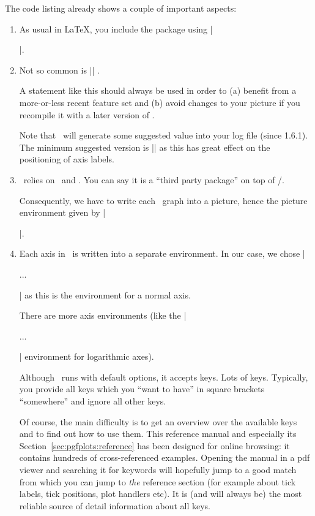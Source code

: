 The code listing already shows a couple of important aspects:
\begin{enumerate}
	\item As usual in \LaTeX, you include the package using |\usepackage{pgfplots}|.
	\item Not so common is |\pgfplotsset{compat=1.5}| .
	
	A statement like this should always be used in order to (a) benefit from a more-or-less recent feature set and (b) avoid changes to your picture if you recompile it with a later version of \PGFPlots.

	Note that \PGFPlots\ will generate some suggested value into your log file (since 1.6.1). The minimum suggested version is |\pgfplotsset{compat=1.3}| as this has great effect on the positioning of axis labels.
	
	\item \PGFPlots\ relies on \Tikz\ and \pgfname. You can say it is a ``third party package'' on top of \Tikz/\pgfname.
	
	Consequently, we have to write each \PGFPlots\ graph into a \Tikz{} picture, hence the picture environment given by ||.
	\item
		Each axis in \PGFPlots\ is written into a separate environment. In our case, we chose |\begin{axis} ... \end{axis}| as this is the environment for a normal axis.

		There are more axis environments (like the |\begin{loglogaxis} ... \end{loglogaxis}| environment for logarithmic axes).

		Although \PGFPlots\ runs with default options, it accepts keys. Lots of keys. Typically, you provide all keys which you ``want to have'' in square brackets ``somewhere'' and ignore all other keys.
		
		Of course, the main difficulty is to get an overview over the available keys and to find out how to use them. This reference manual and especially its Section~\ref{sec:pgfplots:reference} has been designed for online browsing: it contains hundreds of cross-referenced examples. Opening the manual in a pdf viewer and searching it for keywords will hopefully jump to a good match from which you can jump to \emph{the} reference section (for example about tick labels, tick positions, plot handlers etc). It is (and will always be) the most reliable source of detail information about all keys.
		

\end{enumerate}
